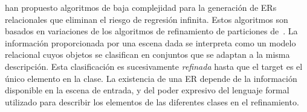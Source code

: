 \cite{arec2:2008:Areces,arec:usin11} han propuesto algoritmos de baja complejidad
 para la generaci\'on de ERs relacionales que eliminan el riesgo de regresi\'on infinita. Estos algoritmos son
basados en variaciones de los algoritmos de refinamiento de particiones
de~\cite{paig:thre87}. La informaci\'on proporcionada por una escena dada
se interpreta como un modelo relacional cuyos objetos se clasifican en
conjuntos que se adaptan a la misma descripci\'on. Esta clasificaci\'on es
sucesivamente \emph{refinada} hasta que el target es el \'unico elemento
en la clase. La existencia de una ER depende
de la informaci\'on disponible en la escena de entrada, y del poder expresivo
del lenguaje formal utilizado para describir los elementos de las
diferentes clases en el refinamiento.\\






